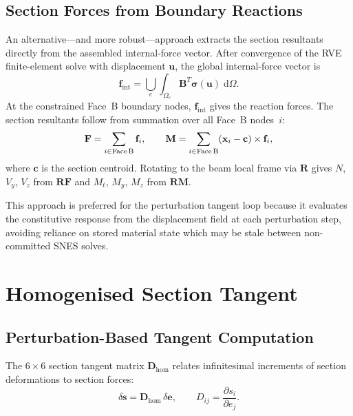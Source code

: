 \subsection{Section Forces from Boundary Reactions}
\label{sec:fe2-reactions}

An alternative---and more robust---approach extracts the section
resultants directly from the assembled internal-force vector.
After convergence of the RVE finite-element solve with displacement
$\mathbf{u}$, the global internal-force vector is
\begin{equation}
  \mathbf{f}_{\mathrm{int}} = \bigcup_{e}
    \int_{\Omega_e} \mathbf{B}^T \boldsymbol{\sigma}(\mathbf{u})
    \; \mathrm{d}\Omega.
\end{equation}
At the constrained Face~B boundary nodes, $\mathbf{f}_{\mathrm{int}}$
gives the reaction forces.  The section resultants follow from
summation over all Face~B nodes~$i$:
\begin{equation}
  \mathbf{F} = \sum_{i \in \text{Face\,B}} \mathbf{f}_i,
  \qquad
  \mathbf{M} = \sum_{i \in \text{Face\,B}}
    (\mathbf{x}_i - \mathbf{c}) \times \mathbf{f}_i,
\end{equation}
where $\mathbf{c}$ is the section centroid.  Rotating to the beam
local frame via $\mathbf{R}$ gives $N$, $V_y$, $V_z$ from
$\mathbf{R}\mathbf{F}$ and $M_t$, $M_y$, $M_z$ from
$\mathbf{R}\mathbf{M}$.

This approach is preferred for the perturbation tangent loop because
it evaluates the constitutive response from the displacement field
at each perturbation step, avoiding reliance on stored material state
which may be stale between non-committed SNES solves.


\section{Homogenised Section Tangent}
\label{sec:fe2-tangent}

\subsection{Perturbation-Based Tangent Computation}

The $6 \times 6$ section tangent matrix
$\mathbf{D}_{\text{hom}}$ relates infinitesimal increments of
section deformations to section forces:
\begin{equation}
  \label{eq:fe2-Dhom}
  \delta\mathbf{s} = \mathbf{D}_{\text{hom}} \, \delta\mathbf{e},
  \qquad
  D_{ij} = \frac{\partial s_i}{\partial e_j}.
\end{equation}

